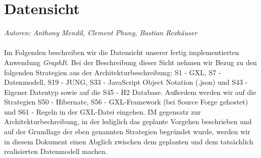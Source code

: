 \documentclass[enabledeprecatedfontcommands,fontsize=11pt,paper=a4,twoside]{scrartcl}
\renewcommand{\headrulewidth}{0pt}
\begin{document}
  \thispagestyle{fancy}
  \fancyhead{}
  \fancyfoot{}
  \renewcommand{\headrulewidth}{0.4pt}
  \tableofcontents

\newpage



\newpage
\section{Datensicht}
\label{sec:datensicht}

\emph{Autoren: Anthony Mendil, Clement Phung, Bastian Rexhäuser}\\ \\

Im Folgenden beschreiben wir die Datensicht unserer fertig implementierten Anwendung \textit{GraphIt}. Bei der Beschreibung dieser Sicht nehmen wir Bezug zu den folgenden Strategien aus der Architekturbeschreibung: S1 - GXL, S7 - Datenmodell, S19 - JUNG, S33 - JavaScript Object Notation (.json) und S43 - Eigener Datentyp sowie auf die S45 - H2 Database. Außerdem werden wir auf die Strategien S50 - Hibernate, S56 - GXL-Framework (bei Source Forge gehostet) und S61 - Regeln in der GXL-Datei eingehen. IM gegensatz zur Architekturbechreibung, in der lediglich das geplante Vorgehen beschrieben und auf der Grundlage der eben genannten Strategien begründet wurde, werden wir in diesem Dokument einen Abglich zwischen dem geplanten und dem tatsächlich realisierten Datenmodell machen. \\
\end{document}
